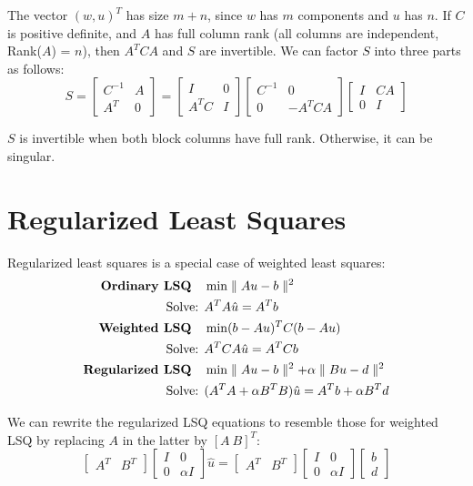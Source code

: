 \documentclass[]{article}
\begin{document}
The vector $(w, u)^{T}$ has size $m + n$, since $w$ has $m$ components and $u$ has $n$. If $C$ is positive definite, and $A$ has full column rank (all columns are independent, Rank($A$) = $n$), then $A^{T}CA$ and $S$ are invertible. We can factor $S$ into three parts as follows:
\begin{equation*}
S = \begin{bmatrix}
C^{-1} & A \\ A^{T} & 0 
\end{bmatrix} = \begin{bmatrix}
I & 0 \\ A^{T}C & I
\end{bmatrix} \begin{bmatrix}
C^{-1} & 0 \\ 0 & -A^{T}CA
\end{bmatrix}\begin{bmatrix}
I & CA \\ 0 & I
\end{bmatrix}
\end{equation*}

$S$ is invertible when both block columns have full rank. Otherwise, it can be singular. 

\section{Regularized Least Squares}

Regularized least squares is a special case of weighted least squares:
\begin{align*}
\textrm{\textbf{Ordinary LSQ}} \quad & \min \parallel Au - b \parallel^2 \\
\textrm{Solve: } & A^TA\hat{u} = A^T b \\
\textrm{\textbf{Weighted LSQ}} \quad & \min (b-Au)^{T} C (b-Au) \\
\textrm{Solve: } & A^T C A\hat{u} = A^T C b \\
\textrm{\textbf{Regularized LSQ}} \quad & \min \parallel Au - b \parallel^2 + \alpha \parallel Bu-d \parallel^2 \\
\textrm{Solve: } & (A^T A + \alpha B^{T}B)\hat{u} = A^{T}b + \alpha B^{T}d
\end{align*}

We can rewrite the regularized LSQ equations to resemble those for weighted LSQ by replacing $A$ in the latter by $[A \ B]^T$:
\begin{equation}
\begin{bmatrix}
A^T & B^T
\end{bmatrix} \begin{bmatrix}
I & 0 \\ 0 & \alpha I 
\end{bmatrix} \hat{u} = \begin{bmatrix}
A^T & B^T
\end{bmatrix}  \begin{bmatrix}
I & 0 \\ 0 & \alpha I 
\end{bmatrix} \begin{bmatrix}
b \\ d
\end{bmatrix}
\end{equation}
\end{document}
